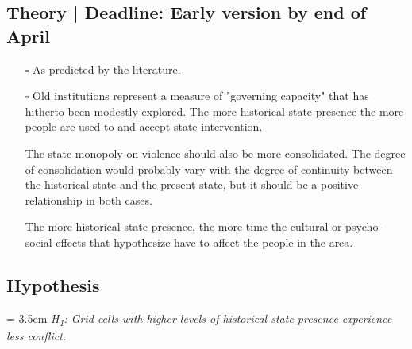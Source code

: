 \documentclass[12pt]{article}
\begin{document}
\subsection{Theory | Deadline: Early version by end of April}
\begin{itemize}
	\item[$\square$] As predicted by the literature.
	\item[$\square$] Old institutions represent a measure of "governing
		capacity" that has hitherto been modestly explored. The more
		historical state presence the more people are used to and accept
		state intervention. 

		The state monopoly on violence should also be more consolidated.
		The degree of consolidation would probably vary with the degree
		of continuity between the historical state and the present
		state, but it should be a positive relationship in both cases. 

		The more historical state presence, the more time the cultural or
		psycho-social effects that \citet{Pinker2012} hypothesize have
		to affect the people in the area.
\end{itemize}

\subsection{Hypothesis}
	\bigskip
	\hangindent = 3.5em
	\textit{H\textsubscript{1}: Grid cells with higher levels of historical
		state presence experience less conflict.
		}
	\bigskip 
\end{document}
